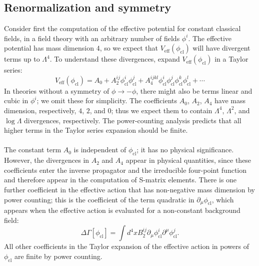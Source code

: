 \subsection{Renormalization and symmetry}
Consider first the computation of the effective potential for constant classical fields, in a field theory with an arbitrary number of fields $\phi^i$. The effective potential has mass dimension $4$, so we expect that $V_{\mathrm{eff}}(\phi_{\mathrm{cl}})$ will have divergent terms up to $\Lambda^4$. To understand these divergences,
expand $V_{\mathrm{eff}}(\phi_{\mathrm{cl}})$ in a Taylor series:
\[V_{\mathrm{eff}}(\phi_{\mathrm{cl}}) = A_0 + A_2^{ij}\phi_{\mathrm{cl}}^i \phi_{\mathrm{cl}}^j + A_4^{ijkl} \phi_{\mathrm{cl}}^i \phi_{\mathrm{cl}}^j \phi_{\mathrm{cl}}^k \phi_{\mathrm{cl}}^l + \cdots\]
In theories without a symmetry of $\phi \to -\phi$, there might also be terms linear and cubic in $\phi^i$; we omit these for simplicity. The coefficients $A_0$, $A_2$, $A_4$ have mass dimension, respectively, $4$, $2$, and $0$; thus we expect them to contain $\Lambda^4$, $\Lambda^2$, and $\log \Lambda$ divergences, respectively. The power-counting analysis predicts that all higher terms in the Taylor series expansion should be finite.
\\ \\
The constant term $A_0$ is independent of $\phi_{\mathrm{cl}}$; it has no physical significance. However, the divergences in $A_2$ and $A_4$ appear in physical quantities, since these coefficients enter the inverse propagator and the irreducible four-point function and therefore appear in the computation of S-matrix elements. There is one further coefficient in the effective action that has non-negative mass dimension by power counting; this is the coefficient of the term quadratic in $\partial_{\mu} \phi_{\mathrm{cl}}$, which appears when the effective action is evaluated for a non-constant background field:
\[\Delta \Gamma [\phi_{\mathrm{cl}}] = \int d^4x B_2^{ij} \partial_{\mu} \phi_{\mathrm{cl}}^i \partial^{\mu} \phi_{\mathrm{cl}}^j.\]
All other coefficients in the Taylor expansion of the effective action in powers of $\phi_{\mathrm{cl}}$ are finite by power counting.
\\ \\

